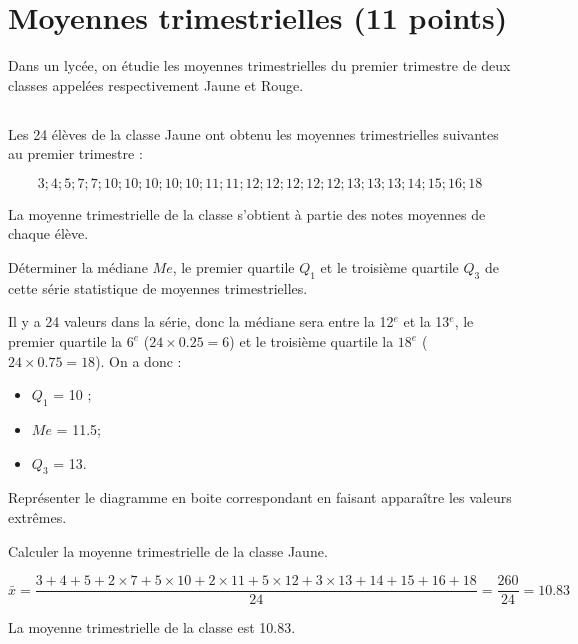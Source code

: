 \section{Moyennes trimestrielles (11 points)}

Dans un lycée, on étudie les moyennes trimestrielles du premier trimestre de deux classes appelées respectivement Jaune et Rouge.

\subsection{}
Les 24 élèves de la classe Jaune ont obtenu les moyennes trimestrielles suivantes au premier trimestre :

\begin{equation*}
3 ; 4 ; 5 ; 7 ; 7 ; 10 ; 10 ; 10 ; 10 ; 10 ; 11 ;  11 ; 12 ; 12 ; 12 ; 12 ; 12 ; 13 ; 13 ; 13 ; 14 ; 15 ; 16 ; 18
\end{equation*}

La moyenne trimestrielle de la classe s'obtient à partie des notes moyennes de chaque élève.

\begin{questions}
	\question[2] Déterminer la médiane $Me$, le premier quartile $Q_1$ et le troisième quartile $Q_3$ de cette série statistique de moyennes trimestrielles.
	\begin{solution}
		Il y a 24 valeurs dans la série, donc la médiane sera entre la 12$^e$ et la 13$^e$, le premier quartile la $6^e$ ($24 \times \num{0.25} = 6$) et le troisième quartile la $18^e$ ($24 \times \num{0.75} = 18$). On a donc :
		
		\begin{itemize}
			\item $Q_1 $ = 10 ;
			\item $Me$ = \num{11.5};
			\item $Q_3$ = 13.
		\end{itemize} 
	\end{solution}
	
	\question[1] Représenter le diagramme en boite correspondant en faisant apparaître les valeurs extrêmes.
	
	\question[1] Calculer la moyenne trimestrielle de la classe Jaune.
	\begin{solution}
		\begin{equation*}
			\bar{x} = \dfrac{3 + 4 + 5 + 2 \times 7 + 5 \times 10 + 2 \times 11 + 5 \times 12 + 3 \times 13 + 14 + 15 + 16 + 18 }{24} = \dfrac{260}{24} = \num{10.83}
		\end{equation*}
		
		La moyenne trimestrielle de la classe est \num{10.83}.
	\end{solution}
\end{questions}

